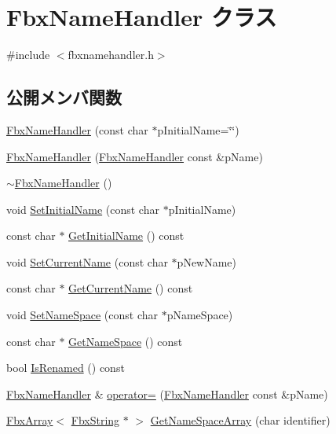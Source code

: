 \hypertarget{class_fbx_name_handler}{}\section{Fbx\+Name\+Handler クラス}
\label{class_fbx_name_handler}


{\ttfamily \#include $<$fbxnamehandler.\+h$>$}

\subsection*{公開メンバ関数}
\begin{DoxyCompactItemize}
\item 
\hyperlink{class_fbx_name_handler_a02a3f41e3f5c9ec99c9ae5217ee3eb8b}{Fbx\+Name\+Handler} (const char $\ast$p\+Initial\+Name=\char`\"{}\char`\"{})
\item 
\hyperlink{class_fbx_name_handler_a267ec29b9e64596ebb3b3453720b8f36}{Fbx\+Name\+Handler} (\hyperlink{class_fbx_name_handler}{Fbx\+Name\+Handler} const \&p\+Name)
\item 
\hyperlink{class_fbx_name_handler_a800bceb8c02a76bf726881f995591bb3}{$\sim$\+Fbx\+Name\+Handler} ()
\item 
void \hyperlink{class_fbx_name_handler_a6504ca871810d1a93f38fa60b9841a3f}{Set\+Initial\+Name} (const char $\ast$p\+Initial\+Name)
\item 
const char $\ast$ \hyperlink{class_fbx_name_handler_a266f9693873fa9042673fac6b1ae630d}{Get\+Initial\+Name} () const
\item 
void \hyperlink{class_fbx_name_handler_afea94fddf5deb3141f8371d8b858336c}{Set\+Current\+Name} (const char $\ast$p\+New\+Name)
\item 
const char $\ast$ \hyperlink{class_fbx_name_handler_a1be12daa1efe1f289972f7cb81bc64fb}{Get\+Current\+Name} () const
\item 
void \hyperlink{class_fbx_name_handler_ac70bc1016ef7888fc736ab42e50857a7}{Set\+Name\+Space} (const char $\ast$p\+Name\+Space)
\item 
const char $\ast$ \hyperlink{class_fbx_name_handler_a7767797106861dea5bef81b8ab592dfd}{Get\+Name\+Space} () const
\item 
bool \hyperlink{class_fbx_name_handler_a9b68199866bcb0fb01709d02d3d064c2}{Is\+Renamed} () const
\item 
\hyperlink{class_fbx_name_handler}{Fbx\+Name\+Handler} \& \hyperlink{class_fbx_name_handler_addc63ffad614f6008022b6eb06a57b6d}{operator=} (\hyperlink{class_fbx_name_handler}{Fbx\+Name\+Handler} const \&p\+Name)
\item 
\hyperlink{class_fbx_array}{Fbx\+Array}$<$ \hyperlink{class_fbx_string}{Fbx\+String} $\ast$ $>$ \hyperlink{class_fbx_name_handler_a4dc170decc57489aad84077e7e3eb0dc}{Get\+Name\+Space\+Array} (char identifier)
\end{DoxyCompactItemize}
